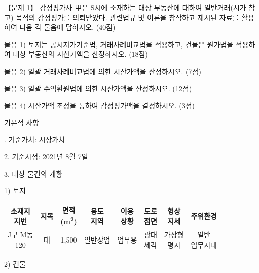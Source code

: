 \begin{longquestion}{【문제 1】}
감정평가사 甲은 S시에 소재하는 대상 부동산에 대하여 일반거래(시가 참고) 목적의 감정평가를 의뢰받았다. 관련법규 및 이론을 참작하고 제시된 자료를 활용하여 다음 각 물음에 답하시오. (40점) \par
\medskip\noindent 물음 1) 토지는 공시지가기준법, 거래사례비교법을 적용하고, 건물은 원가법을 적용하여 대상 부동산의 시산가액을 산정하시오. (18점) \par
\medskip\noindent 물음 2) 일괄 거래사례비교법에 의한 시산가액을 산정하시오. (7점) \par
\medskip\noindent 물음 3) 일괄 수익환원법에 의한 시산가액을 산정하시오. (12점) \par
\medskip\noindent 물음 4) 시산가액 조정을 통하여 감정평가액을 결정하시오. (3점) \par
\medskip{} 기본적 사항 \par
\medskip{}. 기준가치: 시장가치 \par
2. 기준시점: 2021년 8월 7일 \par
3. 대상 물건의 개황 \par
1) 토지 \par
{\small\centering
\begin{tabular}{|c|c|c|c|c|c|c|c|}\hline
\makecell{소재지\\지번} & 지목 & \makecell{면적\\(m\textsuperscript{2})} & \makecell{용도\\지역} & \makecell{이용\\상황} & \makecell{도로\\접면} & \makecell{형상\\지세} & 주위환경 \\\hline
\makecell{J구 M동\\120} & 대 & 1,500 & 일반상업 & 업무용 & \makecell{광대\\세각} & \makecell{가장형\\평지} & \makecell{일반\\업무지대} \\\hline
\end{tabular}\par}
2) 건물 \par

\end{longquestion}
